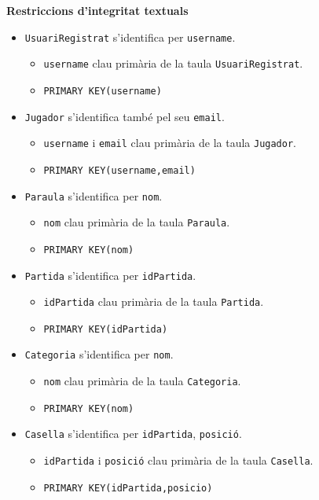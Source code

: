 \textbf{Restriccions d'integritat textuals}
\begin{itemize}
	\item \texttt{UsuariRegistrat} s’identifica per \texttt{username}.
		\begin{itemize}
			\item \texttt{username} clau primària de la taula \texttt{UsuariRegistrat}.
			\item \texttt{PRIMARY KEY(username)}
		\end{itemize}
	\item \texttt{Jugador} s’identifica també pel seu \texttt{email}.
		\begin{itemize}
			\item \texttt{username} i \texttt{email} clau primària de la taula \texttt{Jugador}.
			\item \texttt{PRIMARY KEY(username,email)}
		\end{itemize}
	\item \texttt{Paraula} s’identifica per \texttt{nom}.
		\begin{itemize}
			\item \texttt{nom} clau primària de la taula \texttt{Paraula}.
			\item \texttt{PRIMARY KEY(nom)}
		\end{itemize}
	\item \texttt{Partida} s’identifica per \texttt{idPartida}.
		\begin{itemize}
			\item \texttt{idPartida} clau primària de la taula \texttt{Partida}.
			\item \texttt{PRIMARY KEY(idPartida)}
		\end{itemize}
	\item \texttt{Categoria} s’identifica per \texttt{nom}.
		\begin{itemize}
			\item \texttt{nom} clau primària de la taula \texttt{Categoria}.
			\item \texttt{PRIMARY KEY(nom)}
		\end{itemize}
	\item \texttt{Casella} s’identifica per \texttt{idPartida}, \texttt{posició}.
		\begin{itemize}
			\item \texttt{idPartida} i \texttt{posició} clau primària de la taula \texttt{Casella}.
			\item \texttt{PRIMARY KEY(idPartida,posicio)}
		\end{itemize}

\end{itemize}
